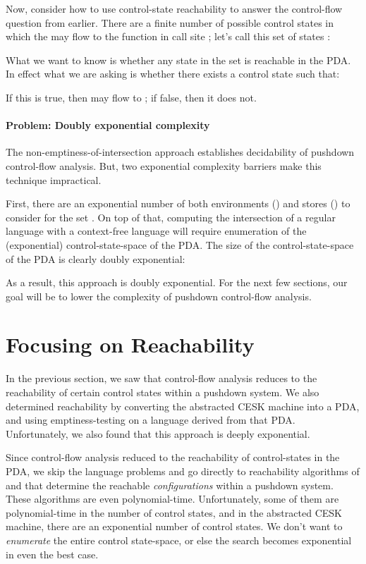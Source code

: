 Now, consider how to use control-state reachability to answer the
control-flow question from earlier.
There are a finite number of possible control states in which the
\lamterm{}  may flow to the function  in call site
; let's call this set of states :

What we want to know is whether any state in the set  is
reachable in the PDA.
In effect what we are asking is whether there exists a control state  such that:

If this is true, then  may flow to ; if false, then it
does not.



\paragraph{Problem: Doubly exponential complexity}
\label{sec:doubly-exponential}
The non-emptiness-of-intersection approach establishes decidability of
pushdown control-flow analysis.
But, two exponential complexity barriers make this technique
impractical.


First, there are an exponential number of both environments
() and stores () to consider for the set .
On top of that, computing the intersection of a regular language with
a context-free language will require enumeration of the
(exponential) control-state-space of the PDA.
The size of the control-state-space of the PDA is clearly doubly exponential:

As a result, this approach is doubly exponential.
For the next few sections, our goal will be to lower the complexity of
pushdown control-flow analysis.


\section{Focusing on Reachability}
\label{sec:pdreachability}

In the previous section, we saw that control-flow analysis reduces to
the reachability of certain control states within a pushdown system.
We also determined reachability by converting the
abstracted CESK machine into a PDA, and using emptiness-testing on a
language derived from that PDA.
Unfortunately, we also found that this approach is deeply exponential.

Since control-flow analysis reduced to the reachability of
control-states in the PDA, we skip the language problems and go
directly to reachability algorithms of
\citet{mattmight:Bouajjani:1997:PDA-Reachability,dvanhorn:Kodumal2004Set,mattmight:Reps:1998:CFL}
and \citet{mattmight:Reps:2005:Weighted-PDA} that determine the
reachable \emph{configurations} within a pushdown system.
These algorithms are even polynomial-time.
Unfortunately, some of them are polynomial-time in the number of
control states, and in the abstracted CESK machine, there are an
exponential number of control states.
We don't want to \emph{enumerate} the entire control state-space, or
else the search becomes exponential in even the best case.

